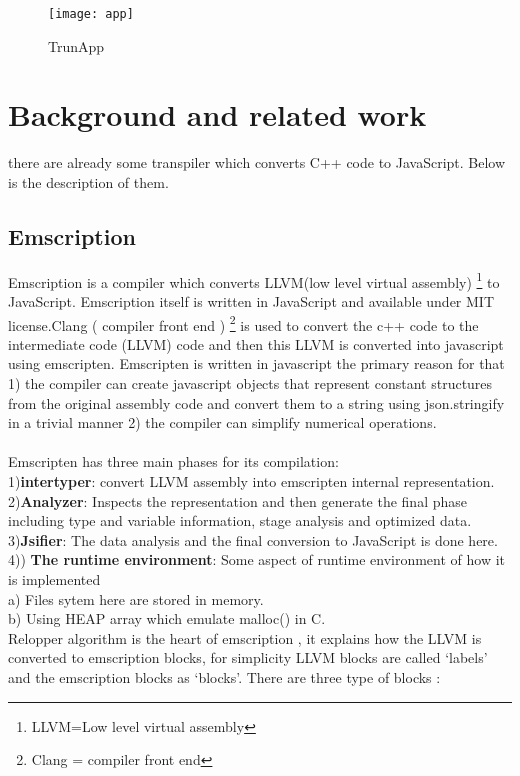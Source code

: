 \documentclass[23pt]{article}
\begin{document}
\begin{figure}[h]
\caption{TrunApp}
\centering
\texttt{[image: app]}
\end{figure}

\newpage

\section{Background and related work}
{\Large there are already some transpiler which converts C++ code to JavaScript. Below is the description of them.   \par }
\subsection{Emscription}
{\Large Emscription is a compiler which converts LLVM(low level virtual assembly) \footnote{LLVM=Low level virtual assembly} to JavaScript. Emscription itself is written in JavaScript and available under MIT license.Clang ( compiler front end ) \footnote{Clang = compiler front end} is used to convert the c++ code to the intermediate code (LLVM) code and then this LLVM is converted into javascript using emscripten. Emscripten is written in javascript the primary reason for that 1) the compiler can create javascript objects that represent constant structures from the original assembly code and convert them to a string using json.stringify in a trivial manner 2) the compiler can simplify numerical operations. \\ \\
Emscripten has three main phases for its compilation: \\ 
1)\textbf{intertyper}: convert LLVM assembly into emscripten internal representation. \\ 
2)\textbf{Analyzer}: Inspects the representation and then generate the final phase including type and variable information, stage analysis and optimized data. \\ 
3)\textbf{Jsifier}: The data analysis and the final conversion to JavaScript is done here. \\ 
4))\textbf{ The runtime environment}: Some aspect of runtime environment of how it is implemented \\
 a) Files sytem here are stored in memory.\\
 b) Using HEAP array which emulate malloc() in C.\\
Relopper algorithm is the heart of emscription , it explains how the LLVM is converted to emscription blocks, for simplicity LLVM blocks are called ‘labels’ and the emscription blocks as ‘blocks’. There are three type of blocks : \\
}
\end{document}
